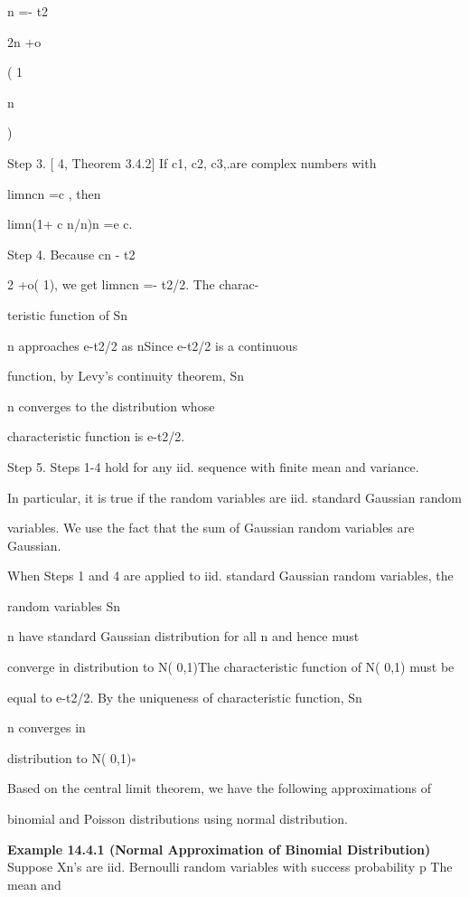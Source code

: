 n =- t2

2n +o

( 1

n

)

Step 3. [ 4, Theorem 3.4.2] If c1, c2, c3,.are complex numbers with

limn\to\infty cn =c , then

limn\to\infty (1+ c n/n)n =e c.

Step 4. Because cn \to- t2

2 +o( 1), we get limn\to\infty cn =- t2/2. The charac-

teristic function of Sn

\sigma\sqrt n approaches e-t2/2 as n\to\infty Since e-t2/2 is a continuous

function, by Levy's continuity theorem, Sn

\sigma\sqrt n converges to the distribution whose

characteristic function is e-t2/2.

Step 5. Steps 1-4 hold for any iid. sequence with finite mean and variance.

In particular, it is true if the random variables are iid. standard Gaussian random

variables. We use the fact that the sum of Gaussian random variables are Gaussian.

When Steps 1 and 4 are applied to iid. standard Gaussian random variables, the

random variables Sn

\sigma\sqrt n have standard Gaussian distribution for all n and hence must

converge in distribution to N( 0,1)The characteristic function of N( 0,1) must be

equal to e-t2/2. By the uniqueness of characteristic function, Sn

\sigma\sqrt n converges in

distribution to N( 0,1)\hfill $\square$

Based on the central limit theorem, we have the following approximations of

binomial and Poisson distributions using normal distribution.

\textbf{Example 14.4.1 (Normal Approximation of Binomial Distribution)} \\

Suppose Xn's are iid. Bernoulli random variables with success probability p The mean and

